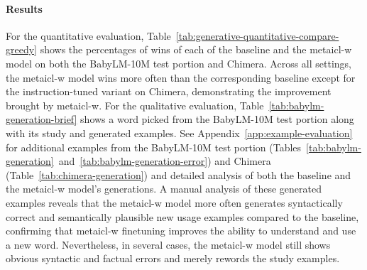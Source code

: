 \documentclass{article}
\begin{document}
\paragraph{Results}
For the quantitative evaluation, Table~\ref{tab:generative-quantitative-compare-greedy} shows the percentages of wins of each of the baseline and the \ac{metaicl-w} model on both the BabyLM-10M test portion and Chimera. Across all settings, the \ac{metaicl-w} model wins more often than the corresponding baseline except for the instruction-tuned variant on Chimera, demonstrating the improvement brought by \ac{metaicl-w}.
For the qualitative evaluation, Table~\ref{tab:babylm-generation-brief} shows a word picked from the BabyLM-10M test portion along with its study and generated examples. See Appendix~\ref{app:example-evaluation} for additional examples from the BabyLM-10M test portion (Tables~\ref{tab:babylm-generation}~and~\ref{tab:babylm-generation-error}) and Chimera (Table~\ref{tab:chimera-generation}) and detailed analysis of both the baseline and the \ac{metaicl-w} model's generations. A manual analysis of these generated examples reveals that the \ac{metaicl-w} model more often generates syntactically correct and semantically plausible new usage examples compared to the baseline, confirming that \ac{metaicl-w} finetuning improves the ability to understand and use a new word. Nevertheless, in several cases, the \ac{metaicl-w} model still shows obvious syntactic and factual errors and merely rewords the study examples.
\end{document}
